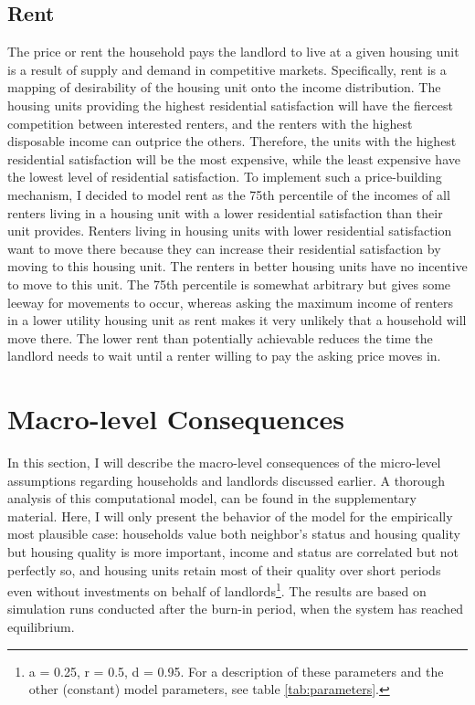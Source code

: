 \documentclass[a4paper,12pt]{article}
\begin{document}
\subsection{Rent}

The price or rent the household pays the landlord to live at a given housing unit is a result of supply and demand in competitive markets. Specifically, rent is a mapping of desirability of the housing unit onto the income distribution. The housing units providing the highest residential satisfaction will have the fiercest competition between interested renters, and the renters with the highest disposable income can outprice the others. Therefore, the units with the highest residential satisfaction will be the most expensive, while the least expensive have the lowest level of residential satisfaction. To implement such a price-building mechanism, I decided to model rent as the 75th percentile of the incomes of all renters living in a housing unit with a lower residential satisfaction than their unit provides. Renters living in housing units with lower residential satisfaction want to move there because they can increase their residential satisfaction by moving to this housing unit. The renters in better housing units have no incentive to move to this unit. The 75th percentile is somewhat arbitrary but gives some leeway for movements to occur, whereas asking the maximum income of renters in a lower utility housing unit as rent makes it very unlikely that a household will move there. The lower rent than potentially achievable reduces the time the landlord needs to wait until a renter willing to pay the asking price moves in. %


\section{Macro-level Consequences}

In this section, I will describe the macro-level consequences of the micro-level assumptions regarding households and landlords discussed earlier. A thorough analysis of this computational model, can be found in the supplementary material. Here, I will only present the behavior of the model for the empirically most plausible case: households value both neighbor's status and housing quality but housing quality is more important, income and status are correlated but not perfectly so, and housing units retain most of their quality over short periods even without investments on behalf of landlords\footnote{a = 0.25, r = 0.5, d = 0.95. For a description of these parameters and the other (constant) model parameters, see table \ref{tab:parameters}.}. The results are based on simulation runs conducted after the burn-in period, when the system has reached equilibrium.
\end{document}
